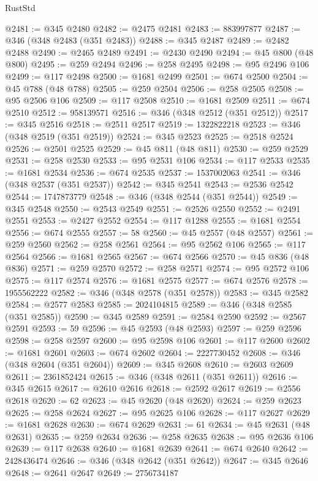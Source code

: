 \begin{lexlean}{RustStd}
\begin{coremodule}
@2481 := @345 @2480
@2482 := @2475 @2481
@2483 := 883997877
@2487 := @346 (@348 @2483 (@351 @2483))
@2488 := @345 @2487
@2489 := @2482 @2488
@2490 := @2465 @2489
@2491 := @2430 @2490
@2494 := @45 @800 (@48 @800)
@2495 := @259 @2494
@2496 := @258 @2495
@2498 := @95 @2496 @106
@2499 := @117 @2498
@2500 := @1681 @2499
@2501 := @674 @2500
@2504 := @45 @788 (@48 @788)
@2505 := @259 @2504
@2506 := @258 @2505
@2508 := @95 @2506 @106
@2509 := @117 @2508
@2510 := @1681 @2509
@2511 := @674 @2510
@2512 := 958139571
@2516 := @346 (@348 @2512 (@351 @2512))
@2517 := @345 @2516
@2518 := @2511 @2517
@2519 := 1322822218
@2523 := @346 (@348 @2519 (@351 @2519))
@2524 := @345 @2523
@2525 := @2518 @2524
@2526 := @2501 @2525
@2529 := @45 @811 (@48 @811)
@2530 := @259 @2529
@2531 := @258 @2530
@2533 := @95 @2531 @106
@2534 := @117 @2533
@2535 := @1681 @2534
@2536 := @674 @2535
@2537 := 1537002063
@2541 := @346 (@348 @2537 (@351 @2537))
@2542 := @345 @2541
@2543 := @2536 @2542
@2544 := 1747873779
@2548 := @346 (@348 @2544 (@351 @2544))
@2549 := @345 @2548
@2550 := @2543 @2549
@2551 := @2526 @2550
@2552 := @2491 @2551
@2553 := @2427 @2552
@2554 := @117 @1288
@2555 := @1681 @2554
@2556 := @674 @2555
@2557 := 58
@2560 := @45 @2557 (@48 @2557)
@2561 := @259 @2560
@2562 := @258 @2561
@2564 := @95 @2562 @106
@2565 := @117 @2564
@2566 := @1681 @2565
@2567 := @674 @2566
@2570 := @45 @836 (@48 @836)
@2571 := @259 @2570
@2572 := @258 @2571
@2574 := @95 @2572 @106
@2575 := @117 @2574
@2576 := @1681 @2575
@2577 := @674 @2576
@2578 := 1955562222
@2582 := @346 (@348 @2578 (@351 @2578))
@2583 := @345 @2582
@2584 := @2577 @2583
@2585 := 2024104815
@2589 := @346 (@348 @2585 (@351 @2585))
@2590 := @345 @2589
@2591 := @2584 @2590
@2592 := @2567 @2591
@2593 := 59
@2596 := @45 @2593 (@48 @2593)
@2597 := @259 @2596
@2598 := @258 @2597
@2600 := @95 @2598 @106
@2601 := @117 @2600
@2602 := @1681 @2601
@2603 := @674 @2602
@2604 := 2227730452
@2608 := @346 (@348 @2604 (@351 @2604))
@2609 := @345 @2608
@2610 := @2603 @2609
@2611 := 2361852424
@2615 := @346 (@348 @2611 (@351 @2611))
@2616 := @345 @2615
@2617 := @2610 @2616
@2618 := @2592 @2617
@2619 := @2556 @2618
@2620 := 62
@2623 := @45 @2620 (@48 @2620)
@2624 := @259 @2623
@2625 := @258 @2624
@2627 := @95 @2625 @106
@2628 := @117 @2627
@2629 := @1681 @2628
@2630 := @674 @2629
@2631 := 61
@2634 := @45 @2631 (@48 @2631)
@2635 := @259 @2634
@2636 := @258 @2635
@2638 := @95 @2636 @106
@2639 := @117 @2638
@2640 := @1681 @2639
@2641 := @674 @2640
@2642 := 2428436474
@2646 := @346 (@348 @2642 (@351 @2642))
@2647 := @345 @2646
@2648 := @2641 @2647
@2649 := 2756734187

\end{coremodule}
\end{lexlean}
